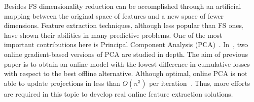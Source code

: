 \documentclass[preprint,12pt]{elsarticle}
\begin{document}
Besides FS dimensionality reduction can be accomplished through an artificial mapping between the original space of features and a new space of fewer dimensions. Feature extraction techniques, although less popular than FS ones, have shown their abilities in many predictive problems. One of the most important contributions here is Principal Component Analysis (PCA)~\cite{jolliffe86}. In~\cite{nie16}, two online gradient-based versions of PCA are studied in depth. The aim of previous paper is to obtain an online model with the lowest difference in cumulative losses with respect to the best offline alternative. Although optimal, online PCA is not able to update projections in less than $O(n^3)$ per iteration~\cite{hazan10}. Thus, more efforts are required in this topic to develop real online feature extraction solutions.



\end{document}
